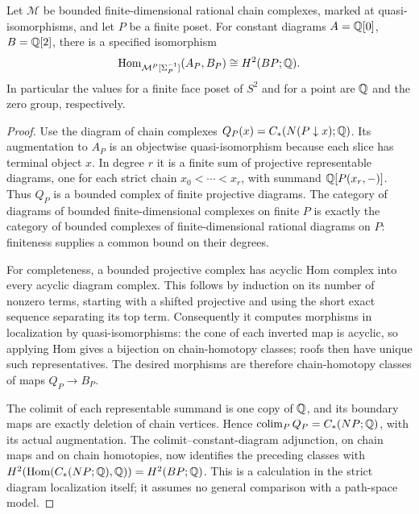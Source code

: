 \begin{lemma}
\label{F:diagram-sphere}
Let $\mathcal M$ be bounded finite-dimensional rational chain complexes,
marked at quasi-isomorphisms, and let $P$ be a finite poset. For constant
diagrams $A=\mathbb Q[0]$, $B=\mathbb Q[2]$, there is a specified isomorphism
\[
 \operatorname{Hom}_{\mathcal M^P[\Sigma_P^{-1}]}(A_P,B_P)
       \cong H^2(BP;\mathbb Q).
\]
In particular the values for a finite face poset of $S^2$ and for a
point are $\mathbb Q$ and the zero group, respectively.
\end{lemma}
\begin{proof}
Use the diagram of chain complexes
$Q_P(x)=C_*(N(P\downarrow x);\mathbb Q)$. Its augmentation to $A_P$ is an
objectwise quasi-isomorphism because each slice has terminal object
$x$. In degree $r$ it is a finite sum of projective representable
diagrams, one for each strict chain $x_0<\cdots<x_r$, with summand
$\mathbb Q[P(x_r,-)]$. Thus $Q_P$ is a bounded complex of finite projective
diagrams. The category of diagrams of bounded finite-dimensional
complexes on finite $P$ is exactly the category of bounded complexes
of finite-dimensional rational diagrams on $P$: finiteness supplies
a common bound on their degrees.

For completeness, a bounded projective complex has acyclic Hom complex
into every acyclic diagram complex. This follows by induction on its
number of nonzero terms, starting with a shifted projective and using
the short exact sequence separating its top term. Consequently it
computes morphisms in localization by quasi-isomorphisms: the cone of
each inverted map is acyclic, so applying Hom gives a bijection on
chain-homotopy classes; roofs then have unique such representatives.
The desired morphisms are therefore chain-homotopy classes of maps
$Q_P\to B_P$.

The colimit of each representable summand is one copy of $\mathbb Q$, and
its boundary maps are exactly deletion of chain vertices. Hence
$\operatorname{colim}_P Q_P=C_*(NP;\mathbb Q)$, with its actual augmentation. The
colimit--constant-diagram adjunction, on chain maps and on chain
homotopies, now identifies the preceding classes with
$H^2(\operatorname{Hom}(C_*(NP;\mathbb Q),\mathbb Q))=H^2(BP;\mathbb Q)$.
This is a calculation in the strict diagram localization itself;
it assumes no general comparison with a path-space model.
\end{proof}

